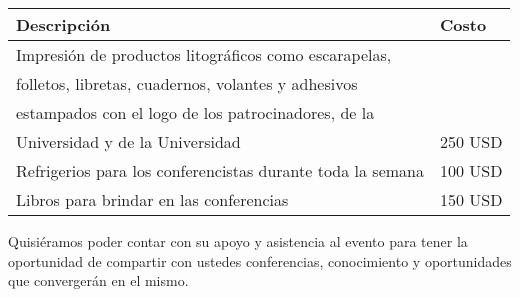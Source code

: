 \begin{table}[htbp]
\begin{center}
\begin{tabular}{|l|l|}
\hline
Descripción & Costo \\
\hline \hline
Impresión de productos litográficos como escarapelas, \\folletos, libretas, cuadernos, volantes y adhesivos\\ estampados con el logo de los patrocinadores, de la \\Universidad y de la Universidad & 250 USD \\ \hline
Refrigerios para los conferencistas durante toda la semana & 100 USD \\ \hline
Libros para brindar en las conferencias & 150 USD \\ \hline
\end{tabular}
\end{center}
\end{table}

Quisi\'eramos poder contar con su apoyo y asistencia al evento para tener la oportunidad de compartir con ustedes conferencias, conocimiento y oportunidades que converger\'an en el mismo.